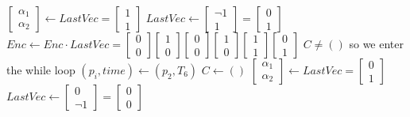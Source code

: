 \begin{example}
\begin{algorithmic}
	\State \hspace{2em} $\begin{bmatrix}\alpha_1 \\ \alpha_2 \end{bmatrix} \gets LastVec= \begin{bmatrix} 1 \\ 1 \end{bmatrix}$
	\State \hspace{2em} $LastVec\gets \begin{bmatrix} \neg 1 \\ 1 \end{bmatrix}=\begin{bmatrix} 0 \\ 1 \end{bmatrix}$ 
	\State \hspace{2em} $Enc\gets Enc\cdot LastVec=\begin{bmatrix} 0 \\ 0 \end{bmatrix}\!\!
	\begin{bmatrix}1 \\ 0 \end{bmatrix}\!\!
	\begin{bmatrix} 0 \\ 0 \end{bmatrix}\!\!
	\begin{bmatrix} 1 \\ 0 \end{bmatrix}\!\!
	\begin{bmatrix} 1 \\ 1 \end{bmatrix}\!\!
	\begin{bmatrix} 0 \\ 1 \end{bmatrix}\!\!$
\State \hrulefill
\State  $C \neq ()$ so we enter the while loop
	\State \hspace{2em} $(p_i,time)\gets (p_2,T_6)$
	\State \hspace{2em} $C\gets ()$
	\State \hspace{2em} $\begin{bmatrix}\alpha_1 \\ \alpha_2 \end{bmatrix} \gets LastVec= \begin{bmatrix} 0 \\ 1 \end{bmatrix}$
	\State \hspace{2em} $LastVec\gets \begin{bmatrix} 0 \\ \neg 1 \end{bmatrix}=\begin{bmatrix} 0 \\ 0 \end{bmatrix}$ 

\end{algorithmic}
\end{example}

